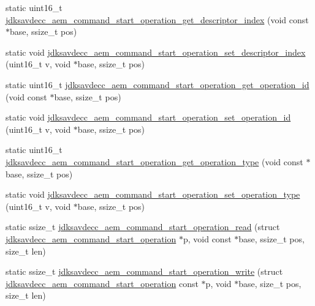 \begin{DoxyCompactItemize}
\item 
static uint16\+\_\+t \hyperlink{group__command__start__operation_gae1a71d403c101467adcff0f74dc643b6}{jdksavdecc\+\_\+aem\+\_\+command\+\_\+start\+\_\+operation\+\_\+get\+\_\+descriptor\+\_\+index} (void const $\ast$base, ssize\+\_\+t pos)
\item 
static void \hyperlink{group__command__start__operation_ga898c28f032e67d1ff2d0aae756abfb76}{jdksavdecc\+\_\+aem\+\_\+command\+\_\+start\+\_\+operation\+\_\+set\+\_\+descriptor\+\_\+index} (uint16\+\_\+t v, void $\ast$base, ssize\+\_\+t pos)
\item 
static uint16\+\_\+t \hyperlink{group__command__start__operation_ga41ab9db90ef10ace3dd74af14ea949f3}{jdksavdecc\+\_\+aem\+\_\+command\+\_\+start\+\_\+operation\+\_\+get\+\_\+operation\+\_\+id} (void const $\ast$base, ssize\+\_\+t pos)
\item 
static void \hyperlink{group__command__start__operation_gaccdb0a33f9c5f4820f0d6085eeef7bfc}{jdksavdecc\+\_\+aem\+\_\+command\+\_\+start\+\_\+operation\+\_\+set\+\_\+operation\+\_\+id} (uint16\+\_\+t v, void $\ast$base, ssize\+\_\+t pos)
\item 
static uint16\+\_\+t \hyperlink{group__command__start__operation_gaa7840852a5f41545689b8689bc029a00}{jdksavdecc\+\_\+aem\+\_\+command\+\_\+start\+\_\+operation\+\_\+get\+\_\+operation\+\_\+type} (void const $\ast$base, ssize\+\_\+t pos)
\item 
static void \hyperlink{group__command__start__operation_gaf6ad38a36311a05bf9c16dc75d43587c}{jdksavdecc\+\_\+aem\+\_\+command\+\_\+start\+\_\+operation\+\_\+set\+\_\+operation\+\_\+type} (uint16\+\_\+t v, void $\ast$base, ssize\+\_\+t pos)
\item 
static ssize\+\_\+t \hyperlink{group__command__start__operation_gac1626678fc533f6030b602f60b10c778}{jdksavdecc\+\_\+aem\+\_\+command\+\_\+start\+\_\+operation\+\_\+read} (struct \hyperlink{structjdksavdecc__aem__command__start__operation}{jdksavdecc\+\_\+aem\+\_\+command\+\_\+start\+\_\+operation} $\ast$p, void const $\ast$base, ssize\+\_\+t pos, size\+\_\+t len)
\item 
static ssize\+\_\+t \hyperlink{group__command__start__operation_gaf0cf1d038dab08ae22452d1516ad876e}{jdksavdecc\+\_\+aem\+\_\+command\+\_\+start\+\_\+operation\+\_\+write} (struct \hyperlink{structjdksavdecc__aem__command__start__operation}{jdksavdecc\+\_\+aem\+\_\+command\+\_\+start\+\_\+operation} const $\ast$p, void $\ast$base, size\+\_\+t pos, size\+\_\+t len)
\end{DoxyCompactItemize}


